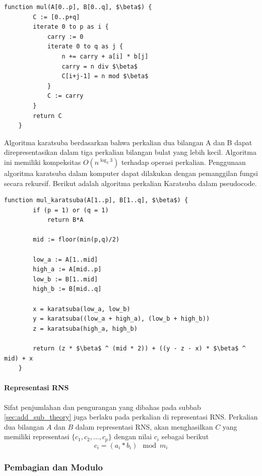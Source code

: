 \begin{lstlisting}[basicstyle=\linespread{1.25}\footnotesize\rmfamily]
    function mul(A[0..p], B[0..q], $\beta$) {
        C := [0..p+q]
        iterate 0 to p as i {
            carry := 0
            iterate 0 to q as j {
                n += carry + a[i] * b[j]
                carry = n div $\beta$
                C[i+j-1] = n mod $\beta$
            }
            C := carry
        }
        return C
    }
\end{lstlisting}

Algoritma karatsuba berdasarkan bahwa perkalian dua bilangan A dan B dapat direpresentasikan dalam tiga perkalian bilangan bulat yang lebih kecil. Algoritma ini memiliki kompeksitas $O(n^{\log_2 3})$ terhadap operasi perkalian. Penggunaan algoritma karatsuba dalam komputer dapat dilakukan dengan pemanggilan fungsi secara rekursif. Berikut adalah algoritma perkalian Karatsuba dalam pseudocode.

\begin{lstlisting}[basicstyle=\linespread{1.25}\footnotesize\rmfamily]
    function mul_karatsuba(A[1..p], B[1..q], $\beta$) {
        if (p = 1) or (q = 1)
            return B*A

        mid := floor(min(p,q)/2)

        low_a := A[1..mid]
        high_a := A[mid..p]
        low_b := B[1..mid]
        high_b := B[mid..q]

        x = karatsuba(low_a, low_b)
        y = karatsuba((low_a + high_a), (low_b + high_b))
        z = karatsuba(high_a, high_b)

        return (z * $\beta$ ^ (mid * 2)) + ((y - z - x) * $\beta$ ^ mid) + x
    }
\end{lstlisting}


\paragraph{Representasi RNS}
Sifat penjumlahan dan pengurangan yang dibahas pada subbab \ref{sec:add_sub_theory} juga berlaku pada perkalian di representasi RNS. Perkalian dua bilangan $A$ dan $B$ dalam representasi RNS, akan menghasilkan $C$ yang memiliki representasi $\{c_1,c_2,...,c_p\}$ dengan nilai $c_i$ sebagai berikut
\begin{equation}
    c_i = (a_i * b_i) \mod m_i
\end{equation}

\subsubsection{Pembagian dan Modulo}

